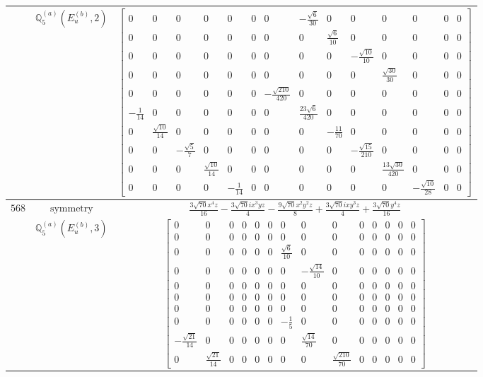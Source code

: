 \documentclass[fleqn,8pt,landscape]{jsarticle}
\begin{document}
\begin{longtable}{ccc}
$  $ & $ \mathbb{Q}_{5}^{(a)}(E_{u}^{(b)},2) $ & $ \begin{bmatrix} 0 & 0 & 0 & 0 & 0 & 0 & 0 & - \frac{\sqrt{6}}{30} & 0 & 0 & 0 & 0 & 0 & 0 \\ 0 & 0 & 0 & 0 & 0 & 0 & 0 & 0 & \frac{\sqrt{6}}{10} & 0 & 0 & 0 & 0 & 0 \\ 0 & 0 & 0 & 0 & 0 & 0 & 0 & 0 & 0 & - \frac{\sqrt{10}}{10} & 0 & 0 & 0 & 0 \\ 0 & 0 & 0 & 0 & 0 & 0 & 0 & 0 & 0 & 0 & \frac{\sqrt{30}}{30} & 0 & 0 & 0 \\ 0 & 0 & 0 & 0 & 0 & 0 & - \frac{\sqrt{210}}{420} & 0 & 0 & 0 & 0 & 0 & 0 & 0 \\ - \frac{1}{14} & 0 & 0 & 0 & 0 & 0 & 0 & \frac{23 \sqrt{6}}{420} & 0 & 0 & 0 & 0 & 0 & 0 \\ 0 & \frac{\sqrt{10}}{14} & 0 & 0 & 0 & 0 & 0 & 0 & - \frac{11}{70} & 0 & 0 & 0 & 0 & 0 \\ 0 & 0 & - \frac{\sqrt{5}}{7} & 0 & 0 & 0 & 0 & 0 & 0 & - \frac{\sqrt{15}}{210} & 0 & 0 & 0 & 0 \\ 0 & 0 & 0 & \frac{\sqrt{10}}{14} & 0 & 0 & 0 & 0 & 0 & 0 & \frac{13 \sqrt{30}}{420} & 0 & 0 & 0 \\ 0 & 0 & 0 & 0 & - \frac{1}{14} & 0 & 0 & 0 & 0 & 0 & 0 & - \frac{\sqrt{10}}{28} & 0 & 0 \end{bmatrix} $ \\ \hline
$ 568 $ & $ \text{symmetry} $ & $ \frac{3 \sqrt{70} x^{4} z}{16} - \frac{3 \sqrt{70} i x^{3} y z}{4} - \frac{9 \sqrt{70} x^{2} y^{2} z}{8} + \frac{3 \sqrt{70} i x y^{3} z}{4} + \frac{3 \sqrt{70} y^{4} z}{16} $ \\
$  $ & $ \mathbb{Q}_{5}^{(a)}(E_{u}^{(b)},3) $ & $ \begin{bmatrix} 0 & 0 & 0 & 0 & 0 & 0 & 0 & 0 & 0 & 0 & 0 & 0 & 0 & 0 \\ 0 & 0 & 0 & 0 & 0 & 0 & 0 & 0 & 0 & 0 & 0 & 0 & 0 & 0 \\ 0 & 0 & 0 & 0 & 0 & 0 & \frac{\sqrt{6}}{10} & 0 & 0 & 0 & 0 & 0 & 0 & 0 \\ 0 & 0 & 0 & 0 & 0 & 0 & 0 & - \frac{\sqrt{14}}{10} & 0 & 0 & 0 & 0 & 0 & 0 \\ 0 & 0 & 0 & 0 & 0 & 0 & 0 & 0 & 0 & 0 & 0 & 0 & 0 & 0 \\ 0 & 0 & 0 & 0 & 0 & 0 & 0 & 0 & 0 & 0 & 0 & 0 & 0 & 0 \\ 0 & 0 & 0 & 0 & 0 & 0 & 0 & 0 & 0 & 0 & 0 & 0 & 0 & 0 \\ 0 & 0 & 0 & 0 & 0 & 0 & - \frac{1}{5} & 0 & 0 & 0 & 0 & 0 & 0 & 0 \\ - \frac{\sqrt{21}}{14} & 0 & 0 & 0 & 0 & 0 & 0 & \frac{\sqrt{14}}{70} & 0 & 0 & 0 & 0 & 0 & 0 \\ 0 & \frac{\sqrt{21}}{14} & 0 & 0 & 0 & 0 & 0 & 0 & \frac{\sqrt{210}}{70} & 0 & 0 & 0 & 0 & 0 \end{bmatrix} $ \\ \hline

\end{longtable}
\end{document}
